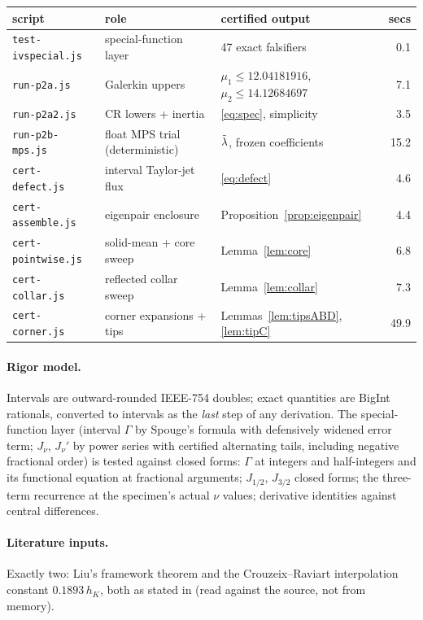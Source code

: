 \documentclass[11pt]{article}
\begin{document}
\begin{center}
\small
\begin{tabular}{@{}lllr@{}}
\toprule
script & role & certified output & secs \\
\midrule
\texttt{test-ivspecial.js} & special-function layer & 47 exact falsifiers & 0.1 \\
\texttt{run-p2a.js}        & Galerkin uppers & $\mu_1\le12.04181916$, $\mu_2\le14.12684697$ & 7.1 \\
\texttt{run-p2a2.js}       & CR lowers + inertia & \eqref{eq:spec}, simplicity & 3.5 \\
\texttt{run-p2b-mps.js}    & float MPS trial (deterministic) & $\tilde\lambda$, frozen coefficients & 15.2 \\
\texttt{cert-defect.js}    & interval Taylor-jet flux & \eqref{eq:defect} & 4.6 \\
\texttt{cert-assemble.js}  & eigenpair enclosure & Proposition~\ref{prop:eigenpair} & 4.4 \\
\texttt{cert-pointwise.js} & solid-mean + core sweep & Lemma~\ref{lem:core} & 6.8 \\
\texttt{cert-collar.js}    & reflected collar sweep & Lemma~\ref{lem:collar} & 7.3 \\
\texttt{cert-corner.js}    & corner expansions + tips & Lemmas~\ref{lem:tipsABD}, \ref{lem:tipC} & 49.9 \\
\bottomrule
\end{tabular}
\end{center}

\paragraph{Rigor model.}
Intervals are outward-rounded IEEE-754 doubles; exact quantities are
BigInt rationals, converted to intervals as the \emph{last} step of any
derivation. The special-function layer (interval $\Gamma$ by Spouge's
formula with defensively widened error term; $J_\nu$, $J_\nu'$ by power
series with certified alternating tails, including negative fractional
order) is tested against closed forms: $\Gamma$ at integers and
half-integers and its functional equation at fractional arguments;
$J_{1/2}$, $J_{3/2}$ closed forms; the three-term recurrence at the
specimen's actual $\nu$ values; derivative identities against central
differences.

\paragraph{Literature inputs.}
Exactly two: Liu's framework theorem and the Crouzeix--Raviart
interpolation constant $0.1893\,h_K$, both as stated in
\cite{YouXieLiu} (read against the source, not from memory).
\end{document}
